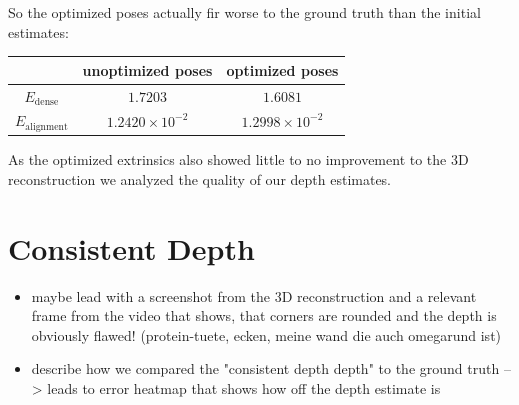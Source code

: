         So the optimized poses actually fir worse to the ground truth than the initial estimates:
        \begin{center}
            \begin{tabular}[]{c | c | c}
                & unoptimized poses & optimized poses\\
                \hline
                $E_{\text{dense}}$ & $1.7203$ & $1.6081$\\
                \hline
                $E_{\text{alignment}}$ & $1.2420\times10^{-2}$ & $1.2998\times10^{-2}$
            \end{tabular}
        \end{center}
        As the optimized extrinsics also showed little to no improvement to the 3D reconstruction we analyzed the quality of our depth estimates.
    \section{Consistent Depth}
        \begin{itemize}
            \item maybe lead with a screenshot from the 3D reconstruction and a relevant frame from the video that shows, that corners are rounded and the depth is obviously flawed! (protein-tuete, ecken, meine wand die auch omegarund ist)
            \item describe how we compared the "consistent depth depth" to the ground truth --> leads to error heatmap that shows how off the depth estimate is
        \end{itemize}